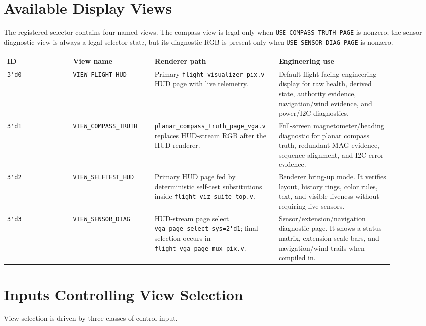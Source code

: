 \documentclass{article}
\newcommand{\sig}[1]{\begingroup\nolinkurl{#1}\endgroup}
\newcommand{\file}[1]{\begingroup\nolinkurl{#1}\endgroup}
\newcommand{\param}[1]{\begingroup\nolinkurl{#1}\endgroup}
\begin{document}
\section{Available Display Views}

The registered selector contains four named views.  The compass view is legal
only when \param{USE_COMPASS_TRUTH_PAGE} is nonzero; the sensor diagnostic view
is always a legal selector state, but its diagnostic RGB is present only when
\param{USE_SENSOR_DIAG_PAGE} is nonzero.

\begin{longtable}{p{0.16\linewidth} p{0.20\linewidth} p{0.26\linewidth} p{0.28\linewidth}}
\toprule
\textbf{ID} & \textbf{View name} & \textbf{Renderer path} & \textbf{Engineering use} \\
\midrule
\endhead
\sig{3'd0} &
\sig{VIEW_FLIGHT_HUD} &
Primary \file{flight_visualizer_pix.v} HUD page with live telemetry. &
Default flight-facing engineering display for raw health, derived state,
authority evidence, navigation/wind evidence, and power/I2C diagnostics. \\

\sig{3'd1} &
\sig{VIEW_COMPASS_TRUTH} &
\file{planar_compass_truth_page_vga.v} replaces HUD-stream RGB after the HUD
renderer. &
Full-screen magnetometer/heading diagnostic for planar compass truth,
redundant MAG evidence, sequence alignment, and I2C error evidence. \\

\sig{3'd2} &
\sig{VIEW_SELFTEST_HUD} &
Primary HUD page fed by deterministic self-test substitutions inside
\file{flight_viz_suite_top.v}. &
Renderer bring-up mode.  It verifies layout, history rings, color rules, text,
and visible liveness without requiring live sensors. \\

\sig{3'd3} &
\sig{VIEW_SENSOR_DIAG} &
HUD-stream page select \sig{vga_page_select_sys=2'd1}; final selection occurs
in \file{flight_vga_page_mux_pix.v}. &
Sensor/extension/navigation diagnostic page.  It shows a status matrix,
extension scale bars, and navigation/wind trails when compiled in. \\
\bottomrule
\end{longtable}

\section{Inputs Controlling View Selection}

View selection is driven by three classes of control input.
\end{document}
